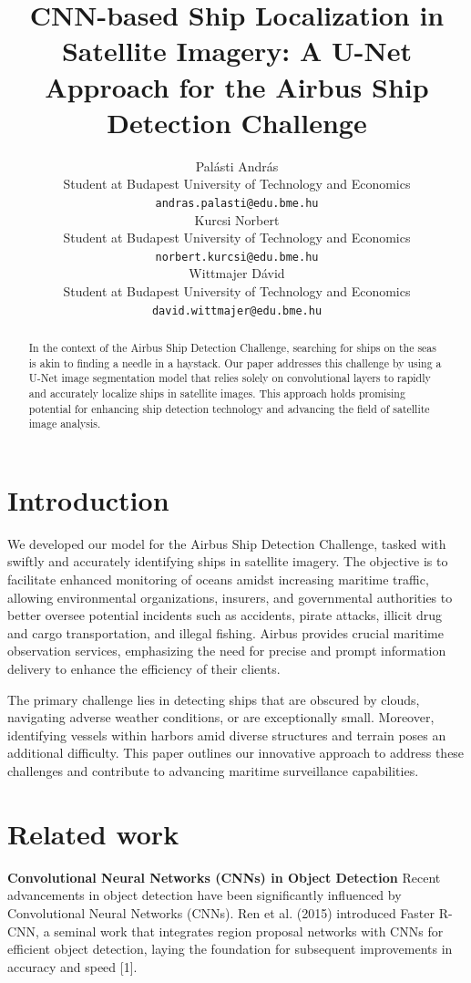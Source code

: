 \documentclass{article}
\title{CNN-based Ship Localization in Satellite Imagery: A U-Net Approach for the Airbus Ship Detection Challenge}
\author{%
  Palásti András \\
  Student at Budapest University of Technology and Economics \\
  \texttt{andras.palasti@edu.bme.hu} \\
  \And
  Kurcsi Norbert \\
  Student at Budapest University of Technology and Economics \\
  \texttt{norbert.kurcsi@edu.bme.hu} \\
  \And
  Wittmajer Dávid \\
  Student at Budapest University of Technology and Economics \\
  \texttt{david.wittmajer@edu.bme.hu} \\
}
\begin{document}
\maketitle


\begin{abstract}
  In the context of the Airbus Ship Detection Challenge, searching for ships
  on the seas is akin to finding a needle in a haystack. Our paper addresses 
  this challenge by using a U-Net image segmentation model that relies 
  solely on convolutional layers to rapidly and accurately localize ships in 
  satellite images. This approach holds promising potential for enhancing ship
  detection technology and advancing the field of satellite image analysis.
\end{abstract}


\section{Introduction}


We developed our model for the Airbus Ship Detection Challenge, tasked with
swiftly and accurately identifying ships in satellite imagery. The objective is
to facilitate enhanced monitoring of oceans amidst increasing maritime traffic,
allowing environmental organizations, insurers, and governmental authorities to
better oversee potential incidents such as accidents, pirate attacks, illicit drug
and cargo transportation, and illegal fishing. Airbus provides crucial maritime
observation services, emphasizing the need for precise and prompt information delivery
to enhance the efficiency of their clients. 

The primary challenge lies in detecting ships that are obscured by clouds, navigating
adverse weather conditions, or are exceptionally small. Moreover, identifying vessels within
harbors amid diverse structures and terrain poses an additional difficulty. This paper
outlines our innovative approach to address these challenges and contribute to advancing
maritime surveillance capabilities.


\section{Related work}


\textbf{Convolutional Neural Networks (CNNs) in Object Detection}
Recent advancements in object detection have been significantly influenced by Convolutional
Neural Networks (CNNs). Ren et al. (2015) introduced Faster R-CNN, a seminal work that
integrates region proposal networks with CNNs for efficient object detection, laying the
foundation for subsequent improvements in accuracy and speed [1].
\end{document}
